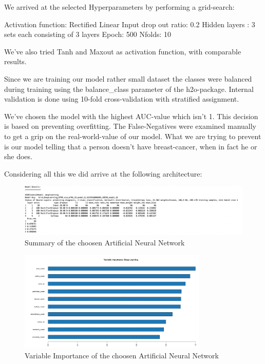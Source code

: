 \documentclass[]{article}
\begin{document}
We arrived at the selected Hyperparameters by performing a grid-search:

Activation function: Rectified Linear Input drop out ratio: 0.2 Hidden
layers : 3 sets each consisting of 3 layers Epoch: 500 Nfolds: 10

We've also tried Tanh and Maxout as activation function, with comparable
results.

Since we are training our model rather small dataset the classes were
balanced during training using the balance\_class parameter of the
h2o-package. Internal validation is done using 10-fold cross-validation
with stratified assignment.

We've chosen the model with the highest AUC-value which isn't 1. This
decision is based on preventing overfitting. The False-Negatives were
examined manually to get a grip on the real-world-value of our model.
What we are trying to prevent is our model telling that a person doesn't
have breast-cancer, when in fact he or she does.

Considering all this we did arrive at the following architecture:

\begin{figure}
    \centering
    \includegraphics[width=1\textwidth]{images/model_details.png}
    \caption{Summary of the choosen Artificial Neural Network}
    \label{fig:model_details}
\end{figure}

\begin{figure}
    \centering
    \includegraphics[width=0.8\textwidth]{images/variable_importance.png}
    \caption{Variable Importance of the choosen Artificial Neural Network}
    \label{fig:variable_importance}
\end{figure}
\end{document}
